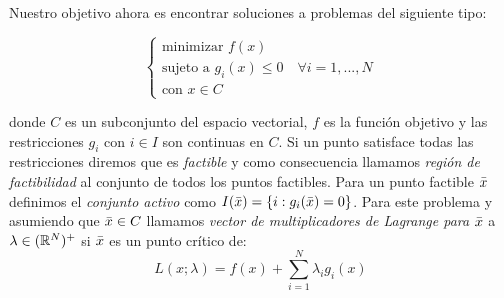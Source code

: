 	Nuestro objetivo ahora es encontrar soluciones a problemas del siguiente tipo:
	
		\begin{equation}\label{probMin}
		\begin{cases}
		\text{minimizar } f(x)\\
		\text{sujeto a } g_i(x) \leq 0 \quad \forall i =1,...,N\\
		\text{con }x \in C
		\end{cases} 
		\end{equation}
		
		donde $ C $ es un subconjunto del espacio vectorial, $ f  $ es la función objetivo y las restricciones $ g_i $ con $ i \in I $ son continuas en $ C $. Si un punto satisface todas las restricciones diremos que es \textit{factible}  y como consecuencia llamamos \textit{región de factibilidad} al conjunto de todos los puntos factibles. Para un punto factible $ \bar{x} $ definimos el \textit{conjunto activo} como $ I(\bar{x}) = \{i: g_i(\bar{x}) = 0\}$. Para este problema y asumiendo que $ \bar{x} \in C $ llamamos \textit{vector de multiplicadores de Lagrange para $ \bar{x} $} a $ \lambda \in (\mathbb{R}^N)^+ $ si $ \bar{x} $ es un punto crítico de:
		\[
		L(x;\lambda) = f(x) + \sum_{i=1}^{N} \lambda_i g_i(x)
		\]
		
